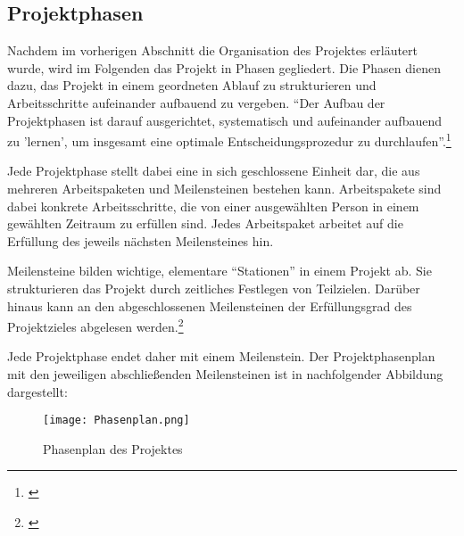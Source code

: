 \subsection{Projektphasen}
\label{sec:Projektphasen}

Nachdem im vorherigen Abschnitt die Organisation des Projektes erläutert wurde,
wird im Folgenden das Projekt in Phasen gegliedert. Die Phasen dienen 
dazu, das Projekt in einem geordneten Ablauf zu strukturieren und
Arbeitsschritte aufeinander aufbauend zu vergeben. "`Der Aufbau der
Projektphasen ist darauf ausgerichtet, systematisch und aufeinander aufbauend
zu 'lernen', um insgesamt eine optimale Entscheidungsprozedur zu
durchlaufen"'.\footnote{\citet{walter2006}}

Jede Projektphase stellt dabei eine in sich geschlossene Einheit dar, die aus
mehreren Arbeitspaketen und Meilensteinen bestehen kann. Arbeitspakete sind
dabei konkrete Arbeitsschritte, die von einer ausgewählten Person in einem
gewählten Zeitraum zu erfüllen sind. Jedes Arbeitspaket arbeitet auf die
Erfüllung des jeweils nächsten Meilensteines hin.

Meilensteine bilden wichtige, elementare "`Stationen"' in einem Projekt ab. Sie
strukturieren das Projekt durch zeitliches Festlegen von Teilzielen.
Darüber hinaus kann an den abgeschlossenen Meilensteinen
der Erfüllungsgrad des Projektzieles abgelesen werden.\footnote{\citet{schels2008}}

Jede Projektphase endet daher mit einem Meilenstein. Der Projektphasenplan mit
den jeweiligen abschließenden Meilensteinen ist in nachfolgender Abbildung
dargestellt:

\begin{figure}[htb] 
\centering
\texttt{[image: Phasenplan.png]}
\caption[Phasenplan des Projektes]{Phasenplan des Projektes\protect\footnotemark}
\label{fig:MockupFrontend}
\end{figure}

